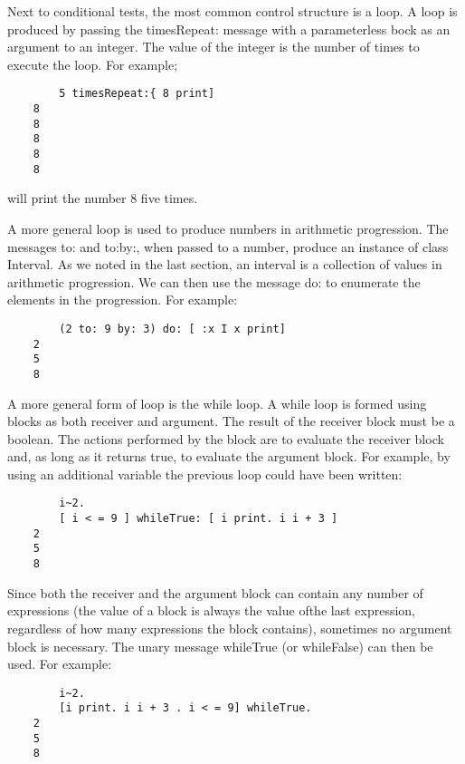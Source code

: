 Next to conditional tests, the most common control structure is a loop.
A loop is produced by passing the timesRepeat: message with a parameterless bock as an argument to an integer. The value of the integer is the
number of times to execute the loop. For example;
\begin{lstlisting}
        5 timesRepeat:{ 8 print]
    8
    8
    8
    8
    8
\end{lstlisting}
will print the number 8 five times.

A more general loop is used to produce numbers in arithmetic progression. The messages to: and to:by:, when passed to a number, produce
an instance of class Interval. As we noted in the last section, an interval
is a collection of values in arithmetic progression. We can then use the
message do: to enumerate the elements in the progression. For example:
\begin{lstlisting}
        (2 to: 9 by: 3) do: [ :x I x print]
    2
    5
    8
\end{lstlisting}

A more general form of loop is the while loop. A while loop is formed
using blocks as both receiver and argument. The result of the receiver
block must be a boolean. The actions performed by the block are to evaluate
the receiver block and, as long as it returns true, to evaluate the argument
block. For example, by using an additional variable the previous loop could
have been written:
\begin{lstlisting}
        i~2.
        [ i < = 9 ] whileTrue: [ i print. i i + 3 ]
    2
    5
    8
\end{lstlisting}
Since both the receiver and the argument block can contain any number
of expressions (the value of a block is always the value ofthe last expression,
regardless of how many expressions the block contains), sometimes no
argument block is necessary. The unary message whileTrue (or whileFalse) can then be used. For example:
\begin{lstlisting}
        i~2.
        [i print. i i + 3 . i < = 9] whileTrue.
    2
    5
    8
\end{lstlisting}

